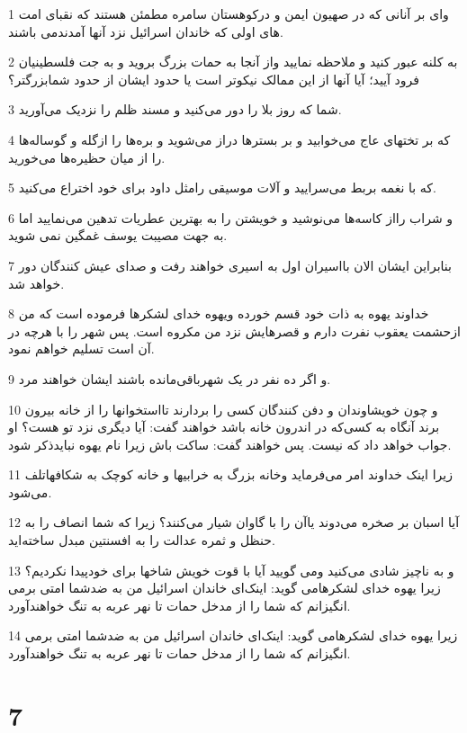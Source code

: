 \par 1 وای بر آنانی که در صهیون ایمن و درکوهستان سامره مطمئن هستند که نقبای امت های اولی که خاندان اسرائیل نزد آنها آمدندمی باشند.
\par 2 به کلنه عبور کنید و ملاحظه نمایید واز آنجا به حمات بزرگ بروید و به جت فلسطینیان فرود آیید؛ آیا آنها از این ممالک نیکوتر است یا حدود ایشان از حدود شمابزرگتر؟
\par 3 شما که روز بلا را دور می‌کنید و مسند ظلم را نزدیک می‌آورید.
\par 4 که بر تختهای عاج می‌خوابید و بر بسترها دراز می‌شوید و بره‌ها را ازگله و گوساله‌ها را از میان حظیره‌ها می‌خورید.
\par 5 که با نغمه بربط می‌سرایید و آلات موسیقی رامثل داود برای خود اختراع می‌کنید.
\par 6 و شراب رااز کاسه‌ها می‌نوشید و خویشتن را به بهترین عطریات تدهین می‌نمایید اما به جهت مصیبت یوسف غمگین نمی شوید.
\par 7 بنابراین ایشان الان بااسیران اول به اسیری خواهند رفت و صدای عیش کنندگان دور خواهد شد.
\par 8 خداوند یهوه به ذات خود قسم خورده ویهوه خدای لشکرها فرموده است که من ازحشمت یعقوب نفرت دارم و قصرهایش نزد من مکروه است. پس شهر را با هر‌چه در آن است تسلیم خواهم نمود.
\par 9 و اگر ده نفر در یک شهرباقی‌مانده باشند ایشان خواهند مرد.
\par 10 و چون خویشاوندان و دفن کنندگان کسی را بردارند تااستخوانها را از خانه بیرون برند آنگاه به کسی‌که در اندرون خانه باشد خواهند گفت: آیا دیگری نزد تو هست؟ او جواب خواهد داد که نیست. پس خواهند گفت: ساکت باش زیرا نام یهوه نبایدذکر شود.
\par 11 زیرا اینک خداوند امر می‌فرماید وخانه بزرگ به خرابیها و خانه کوچک به شکافهاتلف می‌شود.
\par 12 آیا اسبان بر صخره می‌دوند یاآن را با گاوان شیار می‌کنند؟ زیرا که شما انصاف را به حنظل و ثمره عدالت را به افسنتین مبدل ساخته‌اید.
\par 13 و به ناچیز شادی می‌کنید ومی گویید آیا با قوت خویش شاخها برای خودپیدا نکردیم؟زیرا یهوه خدای لشکرهامی گوید: اینک‌ای خاندان اسرائیل من به ضدشما امتی برمی انگیزانم که شما را از مدخل حمات تا نهر عربه به تنگ خواهند‌آورد.
\par 14 زیرا یهوه خدای لشکرهامی گوید: اینک‌ای خاندان اسرائیل من به ضدشما امتی برمی انگیزانم که شما را از مدخل حمات تا نهر عربه به تنگ خواهند‌آورد.

\chapter{7}

